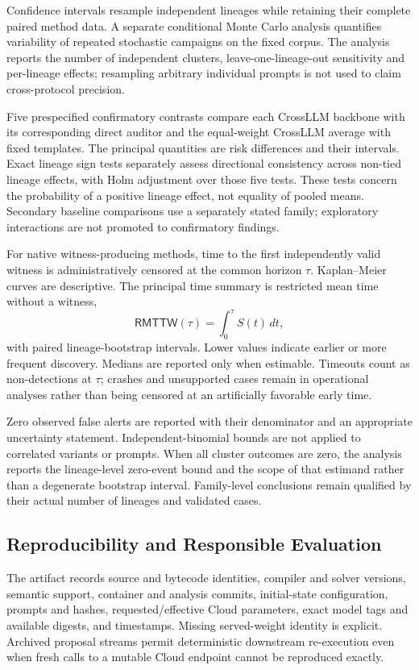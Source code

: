 \documentclass[journal]{IEEEtran}
\theoremstyle{definition}
\begin{document}
Confidence intervals resample independent lineages while retaining their complete paired method data. A separate conditional Monte Carlo analysis quantifies variability of repeated stochastic campaigns on the fixed corpus. The analysis reports the number of independent clusters, leave-one-lineage-out sensitivity and per-lineage effects; resampling arbitrary individual prompts is not used to claim cross-protocol precision.

Five prespecified confirmatory contrasts compare each CrossLLM backbone with its corresponding direct auditor and the equal-weight CrossLLM average with fixed templates. The principal quantities are risk differences and their intervals. Exact lineage sign tests separately assess directional consistency across non-tied lineage effects, with Holm adjustment over those five tests. These tests concern the probability of a positive lineage effect, not equality of pooled means. Secondary baseline comparisons use a separately stated family; exploratory interactions are not promoted to confirmatory findings.

For native witness-producing methods, time to the first independently valid witness is administratively censored at the common horizon $\tau$. Kaplan--Meier curves are descriptive. The principal time summary is restricted mean time without a witness,
\[
\mathsf{RMTTW}(\tau)=\int_0^\tau S(t)\,dt,
\]
with paired lineage-bootstrap intervals. Lower values indicate earlier or more frequent discovery. Medians are reported only when estimable. Timeouts count as non-detections at $\tau$; crashes and unsupported cases remain in operational analyses rather than being censored at an artificially favorable early time.

Zero observed false alerts are reported with their denominator and an appropriate uncertainty statement. Independent-binomial bounds are not applied to correlated variants or prompts. When all cluster outcomes are zero, the analysis reports the lineage-level zero-event bound and the scope of that estimand rather than a degenerate bootstrap interval. Family-level conclusions remain qualified by their actual number of lineages and validated cases.

\subsection{Reproducibility and Responsible Evaluation}

The artifact records source and bytecode identities, compiler and solver versions, semantic support, container and analysis commits, initial-state configuration, prompts and hashes, requested/effective Cloud parameters, exact model tags and available digests, and timestamps. Missing served-weight identity is explicit. Archived proposal streams permit deterministic downstream re-execution even when fresh calls to a mutable Cloud endpoint cannot be reproduced exactly.
\end{document}
